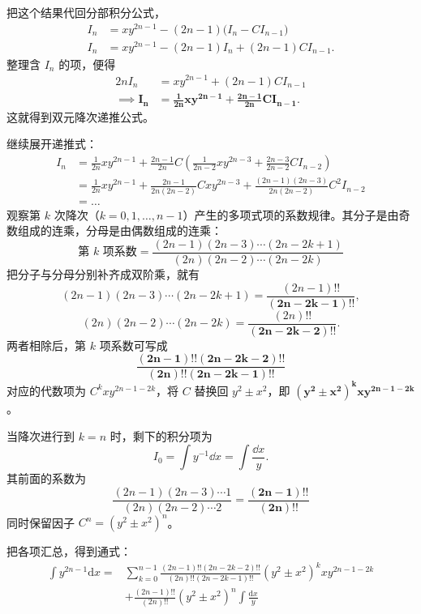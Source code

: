把这个结果代回分部积分公式，
\begin{align*}
I_n &= x y^{2n-1} - (2n-1) \big( I_n - C I_{n-1} \big) \\
I_n &= x y^{2n-1} - (2n-1)I_n + (2n-1)C I_{n-1}.
\end{align*}
整理含 $I_n$ 的项，便得
\begin{align*}
2n I_n &= x y^{2n-1} + (2n-1)C I_{n-1} \\
\implies \mathbf{I_n} &\mathbf{= \frac{1}{2n} x y^{2n-1} + \frac{2n-1}{2n} C I_{n-1}}.
\end{align*}
这就得到双元降次递推公式。

继续展开递推式：
\begin{align*}
I_n &= \frac{1}{2n} x y^{2n-1} + \frac{2n-1}{2n} C \left( \frac{1}{2n-2} x y^{2n-3} + \frac{2n-3}{2n-2} C I_{n-2} \right) \\
&= \frac{1}{2n} x y^{2n-1} + \frac{2n-1}{2n(2n-2)} C x y^{2n-3} + \frac{(2n-1)(2n-3)}{2n(2n-2)} C^2 I_{n-2} \\
&= \dots
\end{align*}
观察第 $k$ 次降次（$k=0, 1, \dots, n-1$）产生的多项式项的系数规律。其分子是由奇数组成的连乘，分母是由偶数组成的连乘：
$$ \text{第 } k \text{ 项系数} = \frac{(2n-1)(2n-3)\cdots(2n-2k+1)}{(2n)(2n-2)\cdots(2n-2k)} $$
把分子与分母分别补齐成双阶乘，就有
\[
(2n-1)(2n-3)\cdots(2n-2k+1) = \frac{(2n-1)!!}{\mathbf{(2n-2k-1)!!}},
\]
\[
(2n)(2n-2)\cdots(2n-2k) = \frac{(2n)!!}{\mathbf{(2n-2k-2)!!}}.
\]
两者相除后，第 \(k\) 项系数可写成
$$ \mathbf{\frac{(2n-1)!!(2n-2k-2)!!}{(2n)!!(2n-2k-1)!!}} $$
对应的代数项为 $C^k x y^{2n-1-2k}$，将 $C$ 替换回 $y^2 \pm x^2$，即 $\mathbf{\left(y^2 \pm x^2\right)^k x y^{2n-1-2k}}$。

当降次进行到 $k=n$ 时，剩下的积分项为
\[
I_0 = \int y^{-1} \dd x = \int \frac{\dd x}{y}.
\]
其前面的系数为
$$ \frac{(2n-1)(2n-3)\cdots 1}{(2n)(2n-2)\cdots 2} = \mathbf{\frac{(2n-1)!!}{(2n)!!}} $$
同时保留因子 $C^n = \left(y^2 \pm x^2\right)^n$。

把各项汇总，得到通式：
\begin{align*}
\int y^{2n-1}\mathrm{d}x =& \sum_{k=0}^{n-1}\frac{(2n-1)!!\left(2n-2k-2\right)!!}{(2n)!!\left(2n-2k-1\right)!!}\left(y^2\pm x^2\right)^k x y^{2n-1-2k} \\
&+ \frac{(2n-1)!!}{(2n)!!}\left(y^2\pm x^2\right)^n\int\frac{\mathrm{d}x}{y}
\end{align*}


